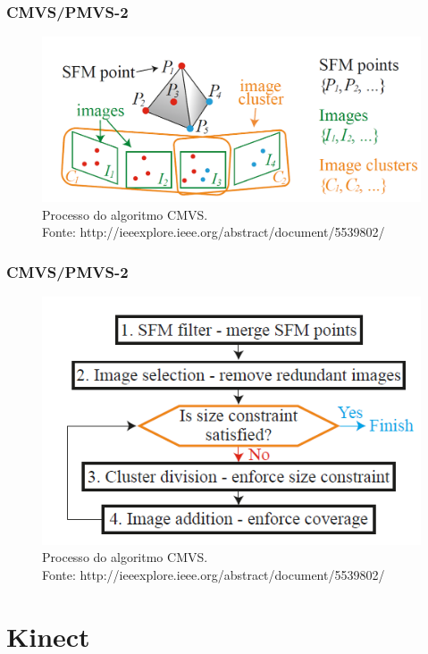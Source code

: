 \documentclass[table, usenames, svgnames, xcolor=dvipsnames]{beamer}
\begin{document}
\begin{frame} 
\frametitle{\textbf{CMVS/PMVS-2}}
	\begin{center}
		\begin{figure}
			\includegraphics[width=0.8\linewidth]{figs/cmvs.png}
			\caption{Processo do algoritmo CMVS. \\
			\tiny{Fonte: http://ieeexplore.ieee.org/abstract/document/5539802/}
			}
		\end{figure}
	\end{center}
\end{frame}

\begin{frame} 
\frametitle{\textbf{CMVS/PMVS-2}}
	\begin{center}
		\begin{figure}
			\includegraphics[width=0.7\linewidth]{figs/cmvspipe.png}
			\caption{Processo do algoritmo CMVS. \\
			\tiny{Fonte: http://ieeexplore.ieee.org/abstract/document/5539802/}
			}
		\end{figure}
	\end{center}
\end{frame}


\section{Kinect}
%
\end{document}
